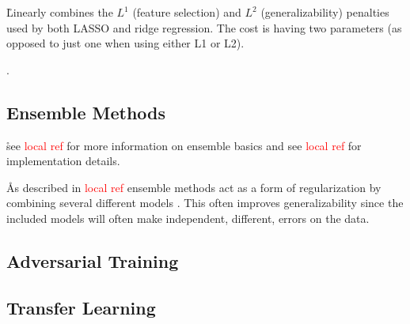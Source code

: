\r{Linearly combines the $L^1$ (feature selection) and $L^2$ (generalizability) penalties used by both LASSO and ridge regression. The cost is having two parameters (as opposed to just one when using either L1 or L2).}

.



\subsection{Ensemble Methods}

\r{see \textcolor{red}{local ref} for more information on ensemble basics and see \textcolor{red}{local ref} for implementation details.}

\r{As described in \textcolor{red}{local ref} ensemble methods act as a form of regularization by combining several different models . This often improves generalizability since the included models will often make independent, different, errors on the data.}

\subsection{Adversarial Training}



\subsection{Transfer Learning}







